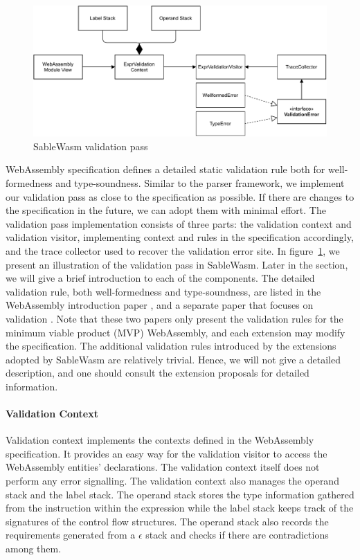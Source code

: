 \begin{figure}
  \centering
  \includegraphics[width=\textwidth]{Images/sablewasm-validation.pdf}
  \caption{SableWasm validation pass}
  \label{fig:sablewasm-validation}
\end{figure}

WebAssembly specification defines a  detailed static validation rule both for well-formedness and type-soundness. Similar to the parser framework, we implement our validation pass as close to the specification as possible. If there are changes to the specification in the future, we can adopt them with minimal effort. The validation pass implementation consists of three parts: the validation context and validation visitor, implementing context and rules in the specification accordingly, and the trace collector used to recover the validation error site.  In figure~\ref{fig:sablewasm-validation}, we present an illustration of the validation pass in SableWasm. Later in the section, we will give a brief introduction to each of the components. The detailed validation rule, both well-formedness and type-soundness, are listed in the WebAssembly introduction paper \cite{10.1145/3062341.3062363}, and a separate paper that focuses on validation \cite{10.1145/3167082}. Note that these two papers only present the validation rules for the minimum viable product (MVP) WebAssembly, and each extension may modify the specification.  The additional validation rules introduced by the extensions adopted by SableWasm are relatively trivial. Hence, we will not give a detailed description, and one should consult the extension proposals for detailed information. 

\paragraph{Validation Context}
Validation context implements the contexts defined in the WebAssembly specification. It provides an easy way for the validation visitor to access the WebAssembly entities' declarations. The validation context itself does not perform any error signalling. The validation context also manages the operand stack and the label stack. The operand stack stores the type information gathered from the instruction within the expression while the label stack keeps track of the signatures of the control flow structures. The operand stack also records the requirements generated from a $\epsilon$ stack and checks if there are contradictions among them. 

